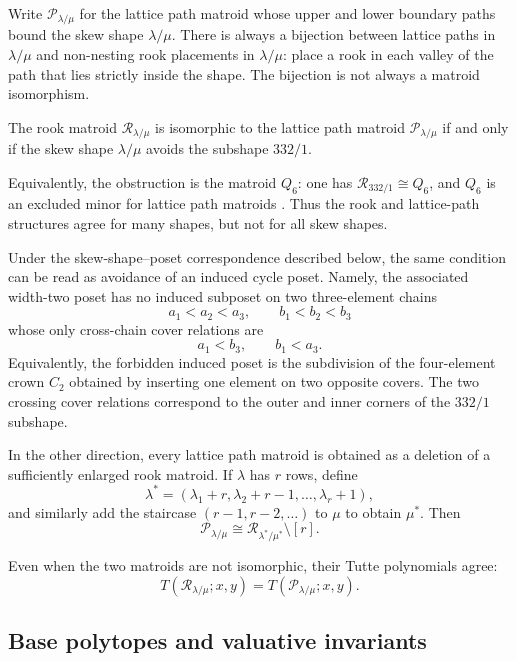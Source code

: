 Write $\mathcal{P}_{\lambda/\mu}$ for the lattice path matroid whose upper and
lower boundary paths bound the skew shape $\lambda/\mu$. There is always a
bijection between lattice paths in $\lambda/\mu$ and non-nesting rook
placements in $\lambda/\mu$: place a rook in each valley of the path that lies
strictly inside the shape. The bijection is not always a matroid isomorphism.

\begin{theorem}
The rook matroid $\mathcal{R}_{\lambda/\mu}$ is isomorphic to the lattice path
matroid $\mathcal{P}_{\lambda/\mu}$ if and only if the skew shape
$\lambda/\mu$ avoids the subshape $332/1$.
\end{theorem}

Equivalently, the obstruction is the matroid $Q_6$: one has
$\mathcal{R}_{332/1}\cong Q_6$, and $Q_6$ is an excluded minor for lattice path
matroids \cite{Bonin2010}. Thus the rook and lattice-path structures agree for
many shapes, but not for all skew shapes.

Under the skew-shape--poset correspondence described below, the same condition
can be read as avoidance of an induced cycle poset. Namely, the associated
width-two poset has no induced subposet on two three-element chains
\[
  a_1 \lt a_2 \lt a_3,\qquad b_1 \lt b_2 \lt b_3
\]
whose only cross-chain cover relations are
\[
  a_1 \lt b_3,\qquad b_1 \lt a_3.
\]
Equivalently, the forbidden induced poset is the subdivision of the
four-element crown $C_2$ obtained by inserting one element on two opposite
covers. The two crossing cover relations correspond to the outer and inner
corners of the $332/1$ subshape.

In the other direction, every lattice path matroid is obtained as a deletion of
a sufficiently enlarged rook matroid. If $\lambda$ has $r$ rows, define
\[
  \lambda^\ast =
  (\lambda_1+r,\lambda_2+r-1,\dotsc,\lambda_r+1),
\]
and similarly add the staircase $(r-1,r-2,\dotsc)$ to $\mu$ to obtain
$\mu^\ast$. Then
\[
  \mathcal{P}_{\lambda/\mu}
  \cong
  \mathcal{R}_{\lambda^\ast/\mu^\ast}\setminus [r].
\]

Even when the two matroids are not isomorphic, their Tutte polynomials agree:
\[
  T(\mathcal{R}_{\lambda/\mu};x,y)
  =
  T(\mathcal{P}_{\lambda/\mu};x,y).
\]

\subsection[rookLatticePathPolytopes]{Base polytopes and valuative invariants}

